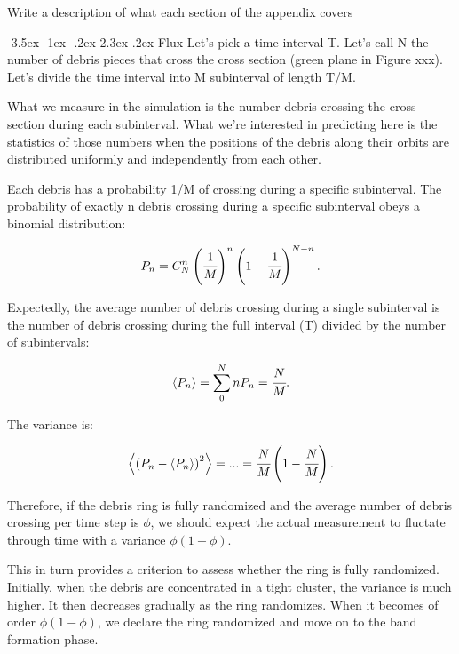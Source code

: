 \documentclass[a4paper, 12pt]{article}
\makeatletter
\renewcommand\section{\clearpage\newpage\@startsection {section}{1}{\z@}%
	{-3.5ex \@plus -1ex \@minus -.2ex}%
	{2.3ex \@plus.2ex}%
	{\normalfont\Large\bfseries}}
\makeatother
\begin{document}


\newpage
\begin{appendices}
Write a description of what each section of the appendix covers
	
\section{Flux}
\label{app:flux}
Let's pick a time interval T. Let's call N the number of debris pieces that cross the cross section (green plane in Figure xxx). Let's divide the time interval into M subinterval of length T/M.

What we measure in the simulation is the number debris crossing the cross section during each subinterval. What we're interested in predicting here is the statistics of those numbers when the positions of the debris along their orbits are distributed uniformly and independently from each other.

Each debris has a probability 1/M of crossing during a specific subinterval. The probability of exactly n debris crossing during a specific subinterval obeys a binomial distribution:

$$P_n = C_N^n \left(\cfrac{1}{M}\right)^n\left(1-\cfrac{1}{M}\right)^{N-n} . $$

Expectedly, the average number of debris crossing during a single subinterval is the number of debris crossing during the full interval (T) divided by the number of subintervals:

$$\left\langle P_n \right\rangle = \sum_0^N n P_n = \cfrac{N}{M} .$$

The variance is:

$$\left\langle \left(P_n-\langle P_n\rangle \right)^2 \right\rangle = ... = \cfrac{N}{M}\left(1-\cfrac{N}{M}\right) . $$

Therefore, if the debris ring is fully randomized and the average number of debris crossing per time step is $\phi$, we should expect the actual measurement to fluctate through time with a variance $\phi(1-\phi)$.

This in turn provides a criterion to assess whether the ring is fully randomized. Initially, when the debris are concentrated in a tight cluster, the variance is much higher. It then decreases gradually as the ring randomizes. When it becomes of order $\phi(1-\phi)$, we declare the ring randomized and move on to the band formation phase.


\end{appendices}
\end{document}
